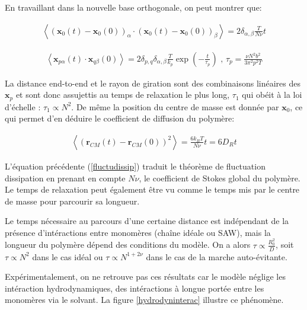 \documentclass[a4paper,11pt]{article}
\begin{document}
En travaillant dans la nouvelle base orthogonale, on peut montrer que:


\begin{eqnarray}
\left<(\textbf{x}_{0}(t)-\textbf{x}_{0}(0))_\alpha \cdot (\textbf{x}_{0}(t)-\textbf{x}_{0}(0))_\beta \right> = 2 \delta_{\alpha ,\beta} \frac{T}{N\nu}t
\end{eqnarray}

\begin{eqnarray}
\left<\textbf{x}_{p\alpha}(t) \cdot \textbf{x}_{q\beta}(0)\right> = 2\delta_{p,q} \delta_{\alpha ,\beta} \frac{T}{k_p} \exp\left(-\frac{t}{\tau_p}\right) \text{ , } \tau _p = \frac{\nu N^2 b^2}{3\pi^2p^2T}
\end{eqnarray}

La distance end-to-end et le rayon de giration sont des combinaisons linéaires des $\textbf{x}_p$ et sont donc assujettis  au temps de relaxation le plus long, $\tau_1$ qui obéit à la loi d'échelle : $\tau_1 \propto N^2$. De même la position du centre de masse est donnée par $\textbf{x}_0$, ce qui permet d'en déduire le coefficient de diffusion du polymère:


\begin{eqnarray}
\left<(\textbf{r}_{CM}(t)-\textbf{r}_{CM}(0))^2\right>=\frac{6 k_B T}{N \nu} t = 6 D_R t
\label{fluctudissip}
\end{eqnarray}




L'équation précédente (\ref{fluctudissip}) traduit le théorème de fluctuation dissipation  en prenant en compte $N \nu$, le coefficient de Stokes global du polymère. Le temps de relaxation peut également être vu comme le temps mis par le centre de masse pour parcourir sa longueur.

 Le temps nécessaire au parcours d'une certaine distance est indépendant de la présence d'intéractions entre monomères (chaîne idéale ou SAW), mais la longueur du polymère dépend des conditions du modèle. On a alors $\tau \propto \frac{R_0^2}{D}$, soit $\tau \propto N^2 $ dans le cas idéal ou $\tau \propto N^{1+2\nu} $ dans le cas de la marche auto-évitante. 

Expérimentalement, on ne retrouve pas ces résultats car le modèle néglige les intéraction hydrodynamiques, des intéractions à longue portée entre les monomères via le solvant. La figure \ref{hydrodyninterac} illustre ce phénomène.
\end{document}
